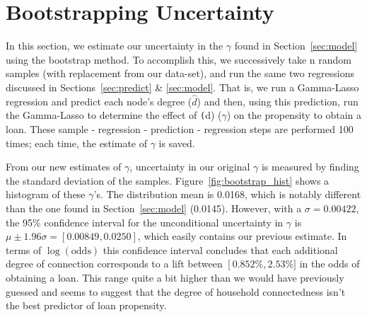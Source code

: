 \documentclass[11pt, fleqn]{article}
\begin{document}
\section{Bootstrapping Uncertainty}

In this section, we estimate our uncertainty in the $\gamma$ found in Section~\ref{sec:model} using the bootstrap method.  To accomplish this, we successively take n random samples (with replacement from our data-set), and run the same two regressions discussed in Sections~\ref{sec:predict} & \ref{sec:model}.  That is, we run a Gamma-Lasso regression and predict each node's degree ($\hat{d}$) and then, using this prediction, run the Gamma-Lasso to determine the effect of \texttt(d) ($\gamma$) on the propensity to obtain a loan.  These sample - regression - prediction - regression steps are performed 100 times; each time, the estimate of $\gamma$ is saved.

From our new estimates of $\gamma$, uncertainty in our original $\gamma$ is measured by finding the standard deviation of the samples.  Figure~\ref{fig:bootstrap_hist} shows a histogram of these $\gamma$'s.  The distribution mean is 0.0168, which is notably different than the one found in Section~\ref{sec:model} (0.0145).  However, with a $\sigma = 0.00422$, the 95\% confidence interval for the unconditional uncertainty in $\gamma$ is $\mu \pm 1.96\sigma = \left[0.00849, 0.0250\right]$, which easily contains our previous estimate.  In terms of $\log(\text{odds})$ this confidence interval concludes that each additional degree of connection corresponds to a lift between $\left[0.852\%, 2.53\%]$ in the odds of obtaining a loan.  This range quite a bit higher than we would have previously guessed and seems to suggest that the degree of household connectedness isn't the best predictor of loan propensity.

\end{document}
